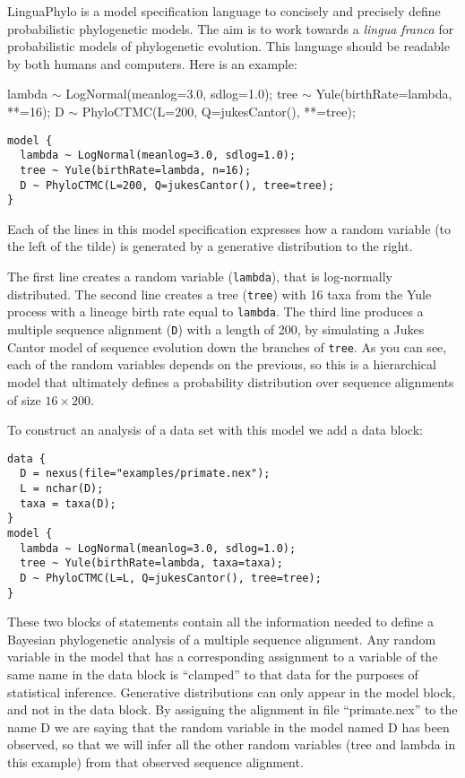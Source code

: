 \documentclass[oneside]{article}
\begin{document}
LinguaPhylo is a model specification language to concisely and
precisely define probabilistic phylogenetic models.
The aim is to work
towards a {\it lingua franca} for probabilistic models of phylogenetic
evolution.
This language should be readable by both humans and
computers.
Here is an example: 
  
{\singlespacing
  \begin{lphylisting}
    lambda $\sim$ LogNormal(meanlog=3.0, sdlog=1.0);
    tree $\sim$ Yule(birthRate=lambda, *\color{grayargs}{n}*=16);
    D $\sim$ PhyloCTMC(L=200, Q=jukesCantor(), *\color{grayargs}{tree}*=tree);
  \end{lphylisting}
}

{\singlespacing
\begin{verbatim}
model {
  lambda ~ LogNormal(meanlog=3.0, sdlog=1.0);
  tree ~ Yule(birthRate=lambda, n=16);
  D ~ PhyloCTMC(L=200, Q=jukesCantor(), tree=tree);
}
\end{verbatim}
}

Each of the lines in this model specification expresses how a random
variable (to the left of the tilde) is generated by a generative
distribution to the right. 

The first line creates a random variable (\texttt{lambda}), that is
log-normally distributed.
The second line creates a tree (\texttt{tree}) with 16 taxa from the
Yule process with a lineage birth rate equal to \texttt{lambda}.
The third line produces a multiple sequence alignment (\texttt{D})
with a length of 200, by simulating a Jukes Cantor model of sequence
evolution down the branches of  \texttt{tree}.
As you can see, each of the random variables depends on the previous,
so this is a hierarchical model that ultimately defines a probability
distribution over sequence alignments of size $16 \times 200$.

To construct an analysis of a data set with this model we add a data block:

{\singlespacing
\begin{verbatim}
data {
  D = nexus(file="examples/primate.nex");
  L = nchar(D);
  taxa = taxa(D);
}
model {
  lambda ~ LogNormal(meanlog=3.0, sdlog=1.0);
  tree ~ Yule(birthRate=lambda, taxa=taxa);
  D ~ PhyloCTMC(L=L, Q=jukesCantor(), tree=tree);
}
\end{verbatim}
}

These two blocks of statements contain all the information needed to define
a Bayesian phylogenetic analysis of a multiple sequence alignment. Any random variable 
in the model that has
a corresponding assignment to a variable of the same name in the data block is ``clamped'' 
to that data for the purposes of statistical inference. Generative distributions can only appear in 
the model block, and not in the data block. By assigning the alignment in file
``primate.nex'' to the name D we are saying that the random variable in the model named D has 
been observed, so that we will infer all the other random variables 
(tree and lambda in this example) from that observed sequence alignment.
\end{document}
